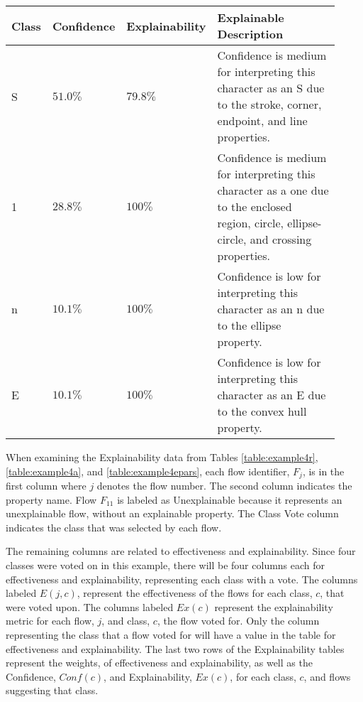 \begin{table}[H]
    \renewcommand{\arraystretch}{1.3}
     \label{table:exexample4a}
    \begin{center}
    \begin{tabular}{| m{0.06\linewidth} | m{0.14\linewidth} | m{0.17\linewidth} | m{0.55\linewidth} |}
        \hline
        Class & Confidence & Explainability & Explainable Description \\
        \hline \hline
        S & $51.0\%$ & $79.8\%$ & Confidence is medium for interpreting this character as an S due to the stroke, corner, endpoint, and line properties. \\ 
        \hline
        1 & $28.8\%$ & $100\%$ & Confidence is medium for interpreting this character as a one due to the enclosed region, circle, ellipse-circle, and crossing properties. \\
        \hline
        n & $10.1\%$ & $100\%$ & Confidence is low for interpreting this character as an n due to the ellipse property. \\
        \hline
        E & $10.1\%$ & $100\%$ & Confidence is low for interpreting this character as an E due to the convex hull property. \\
       \hline
    \end{tabular}
    \end{center}
\end{table}

When examining the Explainability data from Tables \ref{table:example4r},
\ref{table:example4a}, and \ref{table:example4epars}, each flow identifier,
$F_j$, is in the first column where $j$ denotes the flow number.  The second
column indicates the property name. Flow $F_{11}$ is labeled as Unexplainable
because it represents an unexplainable flow, without an explainable property.
The Class Vote column indicates the class that was selected by each flow.

The remaining columns are related to effectiveness and explainability.  Since
four classes were voted on in this example, there will be four columns each for
effectiveness and explainability, representing each class with a vote. The
columns labeled $E(j,c)$, represent the effectiveness of the flows for each
class, $c$, that were voted upon. The columns labeled $Ex(c)$ represent the
explainability metric for each flow, $j$, and class, $c$, the flow voted for.
Only the column representing the class that a flow voted for will have a value
in the table for effectiveness and explainability.  The last two rows of the
Explainability tables represent the weights, of effectiveness and
explainability, as well as the Confidence, $Conf(c)$, and Explainability,
$Ex(c)$, for each class, $c$, and flows suggesting that class.

